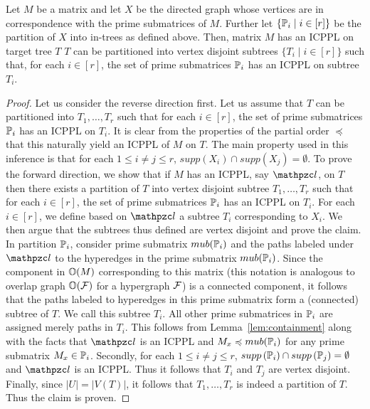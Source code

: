 \begin{lemma}
  \label{lem:subicppa}
  Let $M$ be a matrix and let $X$ be the directed graph whose vertices
  are in correspondence with the prime submatrices of $M$.  Further
  let $\{\mathbb P_i \mid i \in [r]\}$ be the partition of $X$ into in-trees
  as defined above.  Then, matrix $M$ has an ICPPL on target tree $T$
  \iff $T$ can be partitioned into vertex disjoint subtrees $\{T_i
  \mid i \in [r]\}$ such that, for each $i \in [r]$, the set of prime
  submatrices $\mathbb P_i$ has an ICPPL on subtree $T_i$.
\end{lemma}
\begin{proof}\thesisspacing
  Let us consider the reverse direction first.  Let us assume that $T$
  can be partitioned into $T_1, \ldots, T_r$ such that for each $i \in
  [r]$, the set of prime submatrices $\mathbb P_i$ has an ICPPL on $T_i$.
  It is clear from the properties of the partial order $\preccurlyeq$
  that this naturally yield an ICPPL of $M$ on $T$.  The main property
  used in this inference is that for each $1 \leq i \neq j \leq r$,
  $supp(X_i) \cap supp(X_j) = \emptyset$.  To prove the forward
  direction, we show that if $M$ has an ICPPL, say $\cl$, on $T$ then
  there exists a partition of $T$ into vertex disjoint subtree $T_1,
  \ldots, T_r$ such that for each $i \in [r]$, the set of prime
  submatrices $\mathbb P_i$ has an ICPPL on $T_i$.  For each $i \in [r]$, we
  define based on $\cl$ a subtree $T_i$ corresponding to $X_i$.  We
  then argue that the subtrees thus defined are vertex disjoint and
  prove the claim.  In partition $\mathbb P_i$, consider prime submatrix
  $mub(\mathbb P_i)$ and the paths labeled under $\cl$ to the hyperedges in
  the prime submatrix $mub(\mathbb P_i)$.  Since the component in $\mathbb O(M)$
  corresponding to this matrix (this notation is analogous to overlap
  graph $\mathbb O({\cal F})$ for a hypergraph ${\cal F}$) is a connected component,
  it follows that the paths labeled to hyperedges in this prime
  submatrix form a (connected) subtree of $T$.  We call this subtree
  $T_i$.  All other prime submatrices in $\mathbb P_i$ are assigned merely
  paths in $T_i$. This follows from Lemma~\ref{lem:containment} along
  with the facts that $\cl$ is an ICPPL and $M_x \preccurlyeq
  mub(\mathbb P_i)$ for any prime submatrix $M_x \in \mathbb P_i$.  Secondly, for
  each $1 \leq i \neq j \leq r$, $supp\left(\mathbb P_i\right) \cap supp\left(\mathbb P_j\right) =
  \emptyset$ and $\cl$ is an ICPPL. Thus it follows that $T_i$ and
  $T_j$ are vertex disjoint.  Finally, since $|U| = |V(T)|$, it
  follows that $T_1, \ldots, T_r$ is indeed a partition of $T$. Thus
  the claim is proven.
\end{proof}

